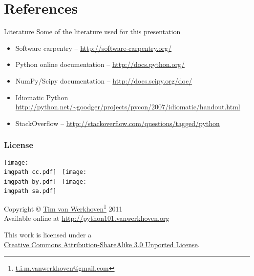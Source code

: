 \documentclass[xetex,10pt]{beamer}
\def\imgpath{../00-img/}
\def\spacer{\vspace*{1em}}
\begin{document}
\section*{References}

\begin{frame}{Literature}
	Some of the literature used for this presentation
	\spacer
	\begin{itemize}
		\item Software carpentry -- \url{http://software-carpentry.org/}
		\item Python online documentation -- \url{http://docs.python.org/}
		\item NumPy/Scipy documentation -- \url{http://docs.scipy.org/doc/}
		\item Idiomatic Python \url{http://python.net/~goodger/projects/pycon/2007/idiomatic/handout.html}
		\item StackOverflow -- \url{http://stackoverflow.com/questions/tagged/python}
	\end{itemize}
	
\end{frame}

\begin{frame}
	\frametitle{License}

	\begin{center}
	\texttt{[image: \\imgpath cc.pdf]}~
	\texttt{[image: \\imgpath by.pdf]}~
	\texttt{[image: \\imgpath sa.pdf]}~
	
	\spacer
	
	Copyright © \href{http://work.vanwerkhoven.org/}{Tim van Werkhoven}\footnote[frame]{\url{t.i.m.vanwerkhoven@gmail.com}} 2011\\
	Available online at \url{http://python101.vanwerkhoven.org}
	
	\spacer
	
	This work is licensed under a\\
	\href{http://creativecommons.org/licenses/by-sa/3.0/}{Creative Commons Attribution-ShareAlike 3.0 Unported License}.

	\end{center}
	
\end{frame}
\end{document}

